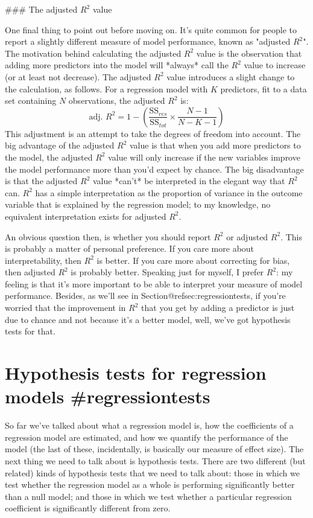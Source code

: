 ### The adjusted $R^2$ value

One final thing to point out before moving on. It's quite common for people to report a slightly different measure of model performance, known as "adjusted $R^2$". The motivation behind calculating the adjusted $R^2$ value is the observation that adding more predictors into the model will *always* call the $R^2$ value to increase (or at least not decrease). The adjusted $R^2$ value introduces a slight change to the calculation, as follows. For a regression model with $K$ predictors, fit to a data set containing $N$ observations, the adjusted $R^2$ is:
$$
\mbox{adj. } R^2 = 1 - \left(\frac{\mbox{SS}_{res}}{\mbox{SS}_{tot}} \times \frac{N-1}{N-K-1} \right)
$$
This adjustment is an attempt to take the degrees of freedom into account. The big advantage of the adjusted $R^2$ value is that when you add more predictors to the model, the adjusted $R^2$ value will only increase if the new variables improve the model performance more than you'd expect by chance. The big disadvantage is that the adjusted $R^2$ value *can't* be interpreted in the elegant way that $R^2$ can. $R^2$ has a simple interpretation as the proportion of variance in the outcome variable that is explained by the regression model; to my knowledge, no equivalent interpretation exists for adjusted $R^2$. 

An obvious question then, is whether you should report $R^2$ or adjusted $R^2$. This is probably a matter of personal preference. If you care more about interpretability, then $R^2$ is better. If you care more about correcting for bias, then adjusted $R^2$ is probably better. Speaking just for myself, I prefer $R^2$: my feeling is that it's more important to be able to interpret your measure of model performance. Besides, as we'll see in Section@refsec:regressiontests, if you're worried that the improvement in $R^2$ that you get by adding a predictor is just due to chance and not because it's a better model, well, we've got hypothesis tests for that. 






\section{Hypothesis tests for regression models {#regressiontests}}

So far we've talked about what a regression model is, how the coefficients of a regression model are estimated, and how we quantify the performance of the model (the last of these, incidentally, is basically our measure of effect size). The next thing we need to talk about is hypothesis tests. There are two different (but related) kinds of hypothesis tests that we need to talk about: those in which we test whether the regression model as a whole is performing significantly better than a null model; and those in which we test whether a particular regression coefficient is significantly different from zero. 


